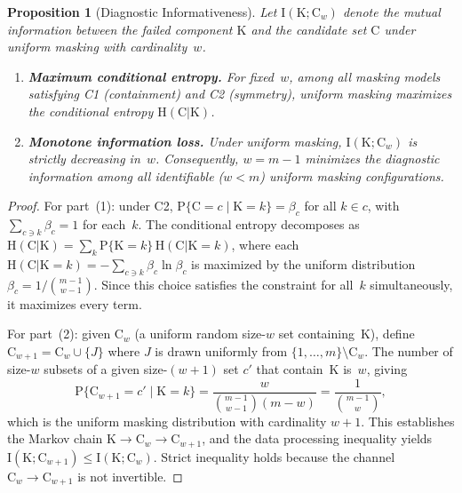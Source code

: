\documentclass[pdflatex,sn-mathphys-num,Numbered]{sn-jnl}
\newcommand{\RV}[1]{\mathrm{#1}}
\newcommand{\Prob}[1]{\mathrm{P}\{#1\}}
\newcommand{\cand}{\RV{C}}         %
\theoremstyle{thmstyleone}
\newtheorem{proposition}[theorem]{Proposition}
\theoremstyle{thmstylethree}
\theoremstyle{thmstyletwo}
\begin{document}
\begin{proposition}[Diagnostic Informativeness]
\label{prop:mutual_info}
Let $\RV{I}(\RV{K}; \cand_w)$ denote the mutual information between the failed component $\RV{K}$ and the candidate set $\cand$ under uniform masking with cardinality~$w$.
\begin{enumerate}
\item \textbf{Maximum conditional entropy.} For fixed~$w$, among all masking models satisfying \emph{C1} (containment) and \emph{C2} (symmetry), uniform masking maximizes the conditional entropy $\RV{H}(\cand | \RV{K})$.
\item \textbf{Monotone information loss.} Under uniform masking, $\RV{I}(\RV{K}; \cand_w)$ is strictly decreasing in~$w$. Consequently, $w = m-1$ minimizes the diagnostic information among all identifiable ($w < m$) uniform masking configurations.
\end{enumerate}
\end{proposition}

\begin{proof}
For part~(1): under C2, $\Prob{\cand = c \mid \RV{K} = k} = \beta_c$ for all $k \in c$, with $\sum_{c \ni k} \beta_c = 1$ for each~$k$. The conditional entropy decomposes as $\RV{H}(\cand | \RV{K}) = \sum_k \Prob{\RV{K}=k}\, \RV{H}(\cand | \RV{K}=k)$, where each $\RV{H}(\cand | \RV{K}=k) = -\sum_{c \ni k} \beta_c \ln \beta_c$ is maximized by the uniform distribution $\beta_c = 1/\binom{m-1}{w-1}$. Since this choice satisfies the constraint for all~$k$ simultaneously, it maximizes every term.

For part~(2): given $\cand_w$ (a uniform random size-$w$ set containing~$\RV{K}$), define $\cand_{w+1} = \cand_w \cup \{J\}$ where $J$ is drawn uniformly from $\{1,\ldots,m\} \setminus \cand_w$. The number of size-$w$ subsets of a given size-$(w+1)$ set $c'$ that contain~$\RV{K}$ is~$w$, giving
\begin{equation*}
\Prob{\cand_{w+1} = c' \mid \RV{K} = k} = \frac{w}{\binom{m-1}{w-1}(m-w)} = \frac{1}{\binom{m-1}{w}},
\end{equation*}
which is the uniform masking distribution with cardinality $w+1$. This establishes the Markov chain $\RV{K} \to \cand_w \to \cand_{w+1}$, and the data processing inequality yields $\RV{I}(\RV{K}; \cand_{w+1}) \leq \RV{I}(\RV{K}; \cand_w)$. Strict inequality holds because the channel $\cand_w \to \cand_{w+1}$ is not invertible.
\end{proof}
\end{document}
